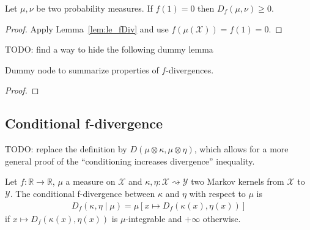 \begin{lemma}
  \label{lem:fDiv_nonneg}
  \leanok
  Let $\mu, \nu$ be two probability measures. If $f(1) = 0$ then $D_f(\mu, \nu) \ge 0$.
\end{lemma}

\begin{proof}\leanok
{}
Apply Lemma~\ref{lem:le_fDiv} and use $f(\mu(\mathcal X)) = f(1) = 0$.
\end{proof}



TODO: find a way to hide the following dummy lemma
\begin{lemma}
  \label{lem:fDiv_properties}
  \leanok
  Dummy node to summarize properties of $f$-divergences.
\end{lemma}

\begin{proof}\leanok
{}
\end{proof}


\subsection{Conditional f-divergence}

TODO: replace the definition by $D(\mu \otimes \kappa, \mu \otimes \eta)$, which allows for a more general proof of the ``conditioning increases divergence'' inequality.

\begin{definition}
  \label{def:condFDiv}
  \leanok
  Let $f : \mathbb{R} \to \mathbb{R}$, $\mu$ a measure on $\mathcal X$ and $\kappa, \eta : \mathcal X \rightsquigarrow \mathcal Y$ two Markov kernels from $\mathcal X$ to $\mathcal Y$. The conditional f-divergence between $\kappa$ and $\eta$ with respect to $\mu$ is
  \begin{align*}
  D_f(\kappa, \eta \mid \mu) = \mu\left[x \mapsto D_f(\kappa(x), \eta(x))\right]
  \end{align*}
  if $x \mapsto D_f(\kappa(x), \eta(x))$ is $\mu$-integrable and $+\infty$ otherwise.
\end{definition}


